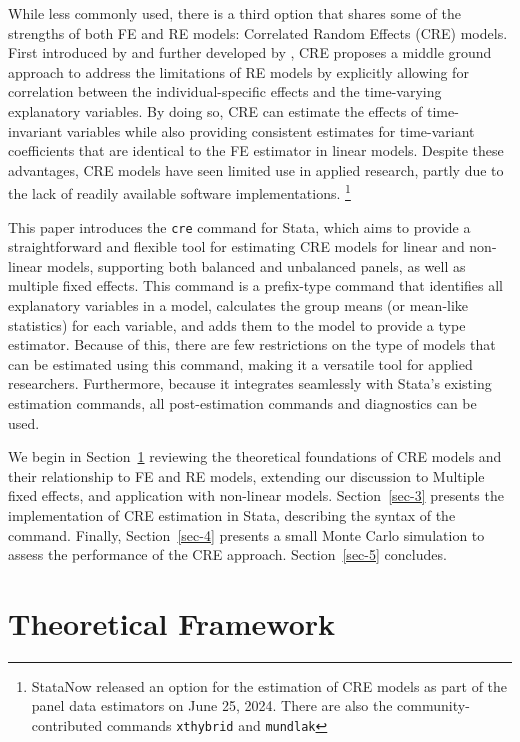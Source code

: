 \documentclass[bib]{statapress}
\begin{document}
While less commonly used, there is a third option that shares some of
the strengths of both FE and RE models: Correlated Random Effects (CRE)
models. First introduced by \citet{mundlak1978pooling} and further
developed by \citet{chamberlain1982multivariate}, CRE proposes a middle
ground approach to address the limitations of RE models by explicitly
allowing for correlation between the individual-specific effects and the
time-varying explanatory variables. By doing so, CRE can estimate the
effects of time-invariant variables while also providing consistent
estimates for time-variant coefficients that are identical to the FE
estimator in linear models. Despite these advantages, CRE models have
seen limited use in applied research, partly due to the lack of readily
available software implementations. \footnote{StataNow released an
  option for the estimation of CRE models as part of the panel data
  estimators on June 25, 2024. There are also the community-contributed
  commands \texttt{xthybrid}\citep{schunck2017} and
  \texttt{mundlak}\citep{perales2013}}

This paper introduces the \texttt{cre} command for Stata, which aims to
provide a straightforward and flexible tool for estimating CRE models
for linear and non-linear models, supporting both balanced and
unbalanced panels, as well as multiple fixed effects. This command is a
prefix-type command that identifies all explanatory variables in a
model, calculates the group means (or mean-like statistics) for each
variable, and adds them to the model to provide a
\citet{mundlak1978pooling} type estimator. Because of this, there are
few restrictions on the type of models that can be estimated using this
command, making it a versatile tool for applied researchers.
Furthermore, because it integrates seamlessly with Stata's existing
estimation commands, all post-estimation commands and diagnostics can be
used.

We begin in Section~\ref{sec-2} reviewing the theoretical foundations of
CRE models and their relationship to FE and RE models, extending our
discussion to Multiple fixed effects, and application with non-linear
models. Section~\ref{sec-3} presents the implementation of CRE
estimation in Stata, describing the syntax of the command. Finally,
Section~\ref{sec-4} presents a small Monte Carlo simulation to assess
the performance of the CRE approach. Section~\ref{sec-5} concludes.

\section{Theoretical Framework}\label{sec-2}
\end{document}
